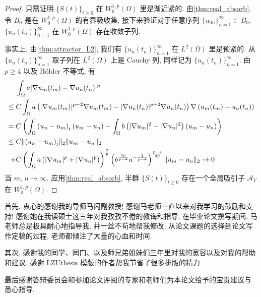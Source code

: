 \documentclass[oneside,longtitle]{LZUthesis}
\numberwithin{equation}{chapter}
\newcommand*\abs[1]{\lvert#1\rvert}
\newcommand*\norm[1]{\lVert#1\rVert}
\newcommand*\Brace[1]{\lbrace#1\rbrace}
\begin{document}
\begin{proof}
	只需证明 $\Brace{S(t)}_{t \geq 0}$ 在 $W_0^{1,p}(\Omega)$ 里是渐近紧的.
	由\cref{thm:real_absorb}, 令 $B_0$ 是在 $W_0^{1,p}(\Omega)$ 的有界吸收集,
	接下来验证对于任意序列
	$\Brace{u_{0n}}_{n=1}^{\infty} \subset B_0$, $\Brace{u_n(t_n)}_{n=1}^{\infty}$
	在 $W_0^{1,p}(\Omega)$ 存在收敛子列.

	事实上, 由\cref{thm:attractor_L2}, 我们有
	$\Brace{u_n(t_n)}_{n=1}^{\infty}$ 在 $L^2(\Omega)$ 里是预紧的.
	从 $\Brace{u_n(t_n)}_{n=1}^{\infty}$ 取子列在 $L^2(\Omega)$ 上是 Cauchy 列,
	同样记为 $\Brace{u_n(t_n)}_{n=1}^{\infty}$. 由 $p \geq 4$ 以及
	H\"older 不等式, 有
	\begin{equation*}
		\begin{split}
			& \int_{\Omega}a\abs{\nabla u_m(t_m) - \nabla u_n(t_n)}^p\\
			\leq{} & C\int_{\Omega}a
			\left(\abs{\nabla u_m(t_m)}^{p-2}\nabla u_m(t_m)
			- \abs{\nabla u_n(t_n)}^{p-2}\nabla u_n(t_n)\right)
			\*\nabla\left(u_m(t_m) - u_n(t_n)\right)\\
			={} & C\left(\int_{\Omega}\left(u_n-u_m\right)_t\left(u_m-u_n\right)
			- \int_{\Omega}b\left(\abs{\nabla u_m}^2 - \abs{\nabla u_n}^2\right)
			\left(u_m - u_n\right)\right)\\
			\leq{} & C\norm{\left(u_n-u_m\right)_t}_2\norm{u_m-u_n}_2\\
			+{} & C\left(\int_{\Omega}a\left(\abs{\nabla u_m}^p
			+ \abs{\nabla u_n}^p\right)\right)^{\frac{2}{p}}
			\left(b^{\frac{2p}{p-4}}a^{-\frac{4}{p-4}}\right)^{\frac{p-4}{2p}}
			\norm{u_m-u_n}_2 \to 0
		\end{split}
	\end{equation*}
	当 $m$, $n \to \infty$. 应用\cref{thm:real_absorb}, 半群 $\Brace{S(t)}_{t \geq 0}$
	存在一个全局吸引子 $\mathcal{A}_V$ 在 $W_0^{1,p}(\Omega)$.
\end{proof}

\appendix




\begin{thanks}
	首先, 衷心的感谢我的导师马闪副教授! 感谢马老师一直以来对我学习的鼓励和支持!
	感谢她在我读硕士这三年对我孜孜不倦的教诲和指导.
	在毕业论文撰写期间, 马老师总是极具耐心地指导我, 并一丝不苟地帮我修改,
	从论文课题的选择到论文写作定稿的过程, 老师都倾注了大量的心血和时间.

	其次, 感谢我的同学、同门、以及师兄弟姐妹们三年里对我的宽容以及对我的帮助和建议.
	感谢 LZUthesis 模版的作者帮我节省了很多排版的精力

	最后感谢答辩委员会和参加论文评阅的专家和老师们为本论文给予的宝贵建议与
	悉心指导.

\end{thanks}
\end{document}
